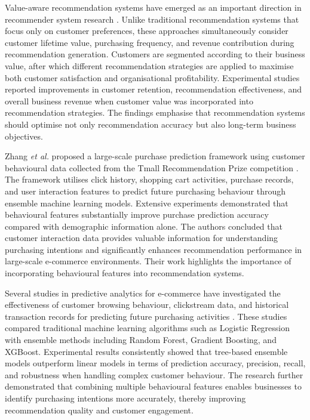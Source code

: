 \documentclass[12pt]{report}
\numberwithin{figure}{chapter}
\numberwithin{table}{chapter}
\numberwithin{equation}{chapter}
\begin{document}
Value-aware recommendation systems have emerged as an important direction in recommender system research \cite{valueaware}. Unlike traditional recommendation systems that focus only on customer preferences, these approaches simultaneously consider customer lifetime value, purchasing frequency, and revenue contribution during recommendation generation. Customers are segmented according to their business value, after which different recommendation strategies are applied to maximise both customer satisfaction and organisational profitability. Experimental studies reported improvements in customer retention, recommendation effectiveness, and overall business revenue when customer value was incorporated into recommendation strategies. The findings emphasise that recommendation systems should optimise not only recommendation accuracy but also long-term business objectives.

Zhang \textit{et al.} proposed a large-scale purchase prediction framework using customer behavioural data collected from the Tmall Recommendation Prize competition \cite{zhang}. The framework utilises click history, shopping cart activities, purchase records, and user interaction features to predict future purchasing behaviour through ensemble machine learning models. Extensive experiments demonstrated that behavioural features substantially improve purchase prediction accuracy compared with demographic information alone. The authors concluded that customer interaction data provides valuable information for understanding purchasing intentions and significantly enhances recommendation performance in large-scale e-commerce environments. Their work highlights the importance of incorporating behavioural features into recommendation systems.

Several studies in predictive analytics for e-commerce have investigated the effectiveness of customer browsing behaviour, clickstream data, and historical transaction records for predicting future purchasing activities \cite{predictive}. These studies compared traditional machine learning algorithms such as Logistic Regression with ensemble methods including Random Forest, Gradient Boosting, and XGBoost. Experimental results consistently showed that tree-based ensemble models outperform linear models in terms of prediction accuracy, precision, recall, and robustness when handling complex customer behaviour. The research further demonstrated that combining multiple behavioural features enables businesses to identify purchasing intentions more accurately, thereby improving recommendation quality and customer engagement.
\end{document}
